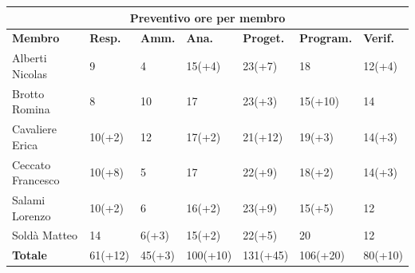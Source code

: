\documentclass[a4paper, 12pt]{article}
\begin{document}
\begin{center}
	\begin{tabularx}{\textwidth}{|X|X|X|X|X|X|X|}
		\hline
		\multicolumn{7}{|c|}{\textbf{Preventivo ore per membro}}                                                \\
		\hline
		\hline
		\textbf{Membro}   & \textbf{Resp.}    & \textbf{Amm.}   & \textbf{Ana.} &
		\textbf{Proget.}  & \textbf{Program.} & \textbf{Verif.}                                                 \\
		\hline
		Alberti Nicolas   & 9                 & 4               & 15(+4)        & 23(+7)   & 18       & 12(+4)  \\
		\hline
		Brotto Romina     & 8                 & 10              & 17            & 23(+3)   & 15(+10)  & 14      \\
		\hline
		Cavaliere Erica   & 10(+2)            & 12              & 17(+2)        & 21(+12)  & 19(+3)   & 14(+3)  \\
		\hline
		Ceccato Francesco & 10(+8)            & 5               & 17            & 22(+9)   & 18(+2)   & 14(+3)  \\
		\hline
		Salami Lorenzo    & 10(+2)            & 6               & 16(+2)        & 23(+9)   & 15(+5)   & 12      \\
		\hline
		Soldà Matteo      & 14                & 6(+3)           & 15(+2)        & 22(+5)   & 20       & 12      \\
		\hline
		\hline
		\textbf{Totale}   & 61(+12)           & 45(+3)          & 100(+10)      & 131(+45) & 106(+20) & 80(+10) \\
		\hline
	\end{tabularx}\\[8pt]
	\mbox{}\\
\end{center}

\newpage
\end{document}
